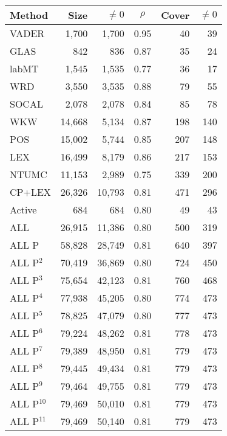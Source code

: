 \begin{tabular}{lrrcrr}
Method       & Size & $\ne 0$ & $\rho$ & Cover & $\ne 0$\\ \hline
VADER        &   1,700 &   1,700 & 0.95 &    40 &    39\\
GLAS         &     842 &     836 & 0.87 &    35 &    24\\
labMT        &   1,545 &   1,535 & 0.77 &    36 &    17\\
WRD          &   3,550 &   3,535 & 0.88 &    79 &    55\\
SOCAL        &   2,078 &   2,078 & 0.84 &    85 &    78\\
WKW          &  14,668 &   5,134 & 0.87 &   198 &   140\\
POS          &  15,002 &   5,744 & 0.85 &   207 &   148\\
LEX          &  16,499 &   8,179 & 0.86 &   217 &   153\\
NTUMC        &  11,153 &   2,989 & 0.75 &   339 &   200\\
CP+LEX       &  26,326 &  10,793 & 0.81 &   471 &   296\\
Active       &     684 &     684 & 0.80 &    49 &    43\\
ALL          &  26,915 &  11,386 & 0.80 &   500 &   319\\
ALL P        &  58,828 &  28,749 & 0.81 &   640 &   397\\
ALL P$^{2}$  &  70,419 &  36,869 & 0.80 &   724 &   450\\
ALL P$^{3}$  &  75,654 &  42,123 & 0.81 &   760 &   468\\
ALL P$^{4}$  &  77,938 &  45,205 & 0.80 &   774 &   473\\
ALL P$^{5}$  &  78,825 &  47,079 & 0.80 &   777 &   473\\
ALL P$^{6}$  &  79,224 &  48,262 & 0.81 &   778 &   473\\
ALL P$^{7}$  &  79,389 &  48,950 & 0.81 &   779 &   473\\
ALL P$^{8}$  &  79,445 &  49,434 & 0.81 &   779 &   473\\
ALL P$^{9}$  &  79,464 &  49,755 & 0.81 &   779 &   473\\
ALL P$^{10}$ &  79,469 &  50,010 & 0.81 &   779 &   473\\
ALL P$^{11}$ &  79,469 &  50,140 & 0.81 &   779 &   473\\
\end{tabular}
